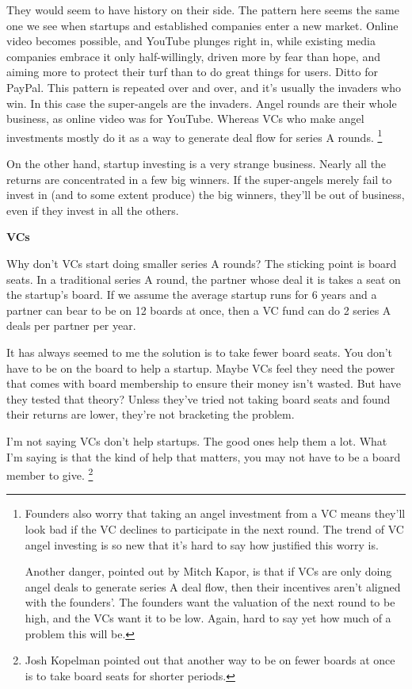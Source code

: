 \documentclass[12pt]{book}
\begin{document}
They would seem to have history on their side. The pattern here seems
the same one we see when startups and established companies enter a new
market. Online video becomes possible, and YouTube plunges right in,
while existing media companies embrace it only half-willingly, driven
more by fear than hope, and aiming more to protect their turf than to do
great things for users. Ditto for PayPal. This pattern is repeated over
and over, and it's usually the invaders who win. In this case the
super-angels are the invaders. Angel rounds are their whole business, as
online video was for YouTube. Whereas VCs who make angel investments
mostly do it as a way to generate deal flow for series A rounds.
\footnote{Founders also worry that taking an angel investment from a VC
means they'll look bad if the VC declines to participate in the next
round. The trend of VC angel investing is so new that it's hard to say
how justified this worry is.

Another danger, pointed out by Mitch Kapor, is that if VCs are only
doing angel deals to generate series A deal flow, then their incentives
aren't aligned with the founders'. The founders want the valuation of
the next round to be high, and the VCs want it to be low. Again, hard to
say yet how much of a problem this will be.}

On the other hand, startup investing is a very strange business. Nearly
all the returns are concentrated in a few big winners. If the
super-angels merely fail to invest in (and to some extent produce) the
big winners, they'll be out of business, even if they invest in all the
others.

\textbf{VCs}

Why don't VCs start doing smaller series A rounds? The sticking point is
board seats. In a traditional series A round, the partner whose deal it
is takes a seat on the startup's board. If we assume the average startup
runs for 6 years and a partner can bear to be on 12 boards at once, then
a VC fund can do 2 series A deals per partner per year.

It has always seemed to me the solution is to take fewer board seats.
You don't have to be on the board to help a startup. Maybe VCs feel they
need the power that comes with board membership to ensure their money
isn't wasted. But have they tested that theory? Unless they've tried not
taking board seats and found their returns are lower, they're not
bracketing the problem.

I'm not saying VCs don't help startups. The good ones help them a lot.
What I'm saying is that the kind of help that matters, you may not have
to be a board member to give. \footnote{Josh Kopelman pointed out that another way to be on fewer boards
at once is to take board seats for shorter periods.}
\end{document}
